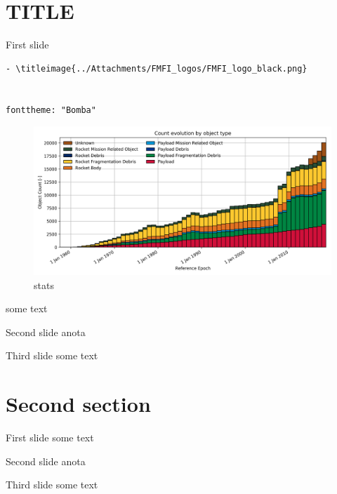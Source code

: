 \section{TITLE}\label{title}

\begin{frame}[fragile]{First slide}
\label{first-slide}
\begin{verbatim}
- \titleimage{../Attachments/FMFI_logos/FMFI_logo_black.png}


fonttheme: "Bomba"
\end{verbatim}

\begin{figure}
\centering
\includegraphics[width=0.5\linewidth,height=\textheight,keepaspectratio]{../templates/debris_stats.png}
\caption{stats}
\end{figure}

some text
\end{frame}

\begin{frame}{Second slide}
\label{second-slide}
anota
\end{frame}

\begin{frame}{Third slide}
\label{third-slide}
some text
\end{frame}

\section{Second section}\label{second-section}

\begin{frame}{First slide}
\label{first-slide-1}
some text
\end{frame}

\begin{frame}{Second slide}
\label{second-slide-1}
anota
\end{frame}

\begin{frame}{Third slide}
\label{third-slide-1}
some text
\end{frame}
